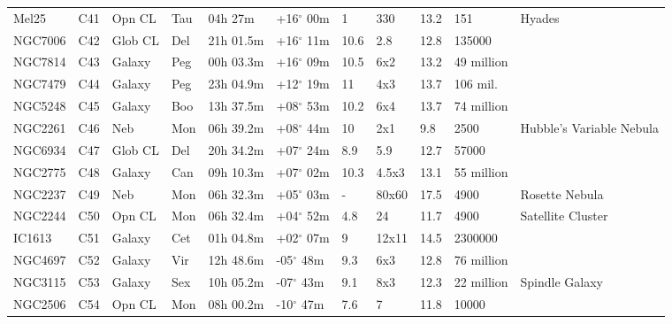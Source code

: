 \begin{longtable}{@{}lllllllllll@{}}
Mel25      & C41           & Opn CL  & Tau & 04h 27m   & +16$^{\circ}$ 00m & 1    & 330            & 13.2 & 151           & Hyades                          \\
NGC7006    & C42           & Glob CL & Del & 21h 01.5m & +16$^{\circ}$ 11m & 10.6 & 2.8            & 12.8 & 135000        &                                 \\
NGC7814    & C43           & Galaxy  & Peg & 00h 03.3m & +16$^{\circ}$ 09m & 10.5 & 6x2            & 13.2 & 49 million    &                                 \\
NGC7479    & C44           & Galaxy  & Peg & 23h 04.9m & +12$^{\circ}$ 19m & 11   & 4x3            & 13.7 & 106 mil.      &                                 \\
NGC5248    & C45           & Galaxy  & Boo & 13h 37.5m & +08$^{\circ}$ 53m & 10.2 & 6x4            & 13.7 & 74 million    &                                 \\
NGC2261    & C46           & Neb     & Mon & 06h 39.2m & +08$^{\circ}$ 44m & 10   & 2x1            & 9.8  & 2500          & Hubble's Variable Nebula        \\
NGC6934    & C47           & Glob CL & Del & 20h 34.2m & +07$^{\circ}$ 24m & 8.9  & 5.9            & 12.7 & 57000         &                                 \\
NGC2775    & C48           & Galaxy  & Can & 09h 10.3m & +07$^{\circ}$ 02m & 10.3 & 4.5x3          & 13.1 & 55 million    &                                 \\
NGC2237    & C49           & Neb     & Mon & 06h 32.3m & +05$^{\circ}$ 03m & -    & 80x60          & 17.5 & 4900          & Rosette Nebula                  \\
NGC2244    & C50           & Opn CL  & Mon & 06h 32.4m & +04$^{\circ}$ 52m & 4.8  & 24             & 11.7 & 4900          & Satellite Cluster               \\
IC1613     & C51           & Galaxy  & Cet & 01h 04.8m & +02$^{\circ}$ 07m & 9    & 12x11          & 14.5 & 2300000       &                                 \\
NGC4697    & C52           & Galaxy  & Vir & 12h 48.6m & -05$^{\circ}$ 48m & 9.3  & 6x3            & 12.8 & 76 million    &                                 \\
NGC3115    & C53           & Galaxy  & Sex & 10h 05.2m & -07$^{\circ}$ 43m & 9.1  & 8x3            & 12.3 & 22 million    & Spindle Galaxy                  \\
NGC2506    & C54           & Opn CL  & Mon & 08h 00.2m & -10$^{\circ}$ 47m & 7.6  & 7              & 11.8 & 10000         &                                 \\

\end{longtable}
